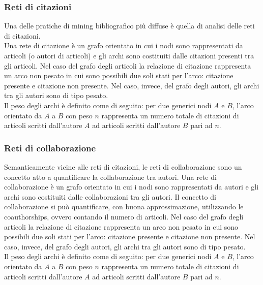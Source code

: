 \documentclass[a4paper, 12pt]{article}
\begin{document}
\subsubsection{Reti di citazioni}
Una delle pratiche di mining bibliografico più diffuse è quella di analisi delle reti di citazioni. \\
Una rete di citazione è un grafo orientato in cui i nodi sono rappresentati da articoli (o autori di articoli) e gli archi sono costituiti dalle citazioni presenti tra gli articoli. Nel caso del grafo degli articoli la relazione di citazione rappresenta un arco non pesato in cui sono possibili due soli stati per l'arco: citazione presente e citazione non presente.
Nel caso, invece, del grafo degli autori, gli archi tra gli autori sono di tipo pesato. \\
Il peso degli archi è definito come di seguito: per due generici nodi $A$ e $B$, l'arco orientato da $A$ a $B$ con peso $n$ rappresenta un numero totale di citazioni di articoli scritti dall'autore $A$ ad articoli scritti dall'autore $B$ pari ad $n$.
\subsubsection{Reti di collaborazione}
Semanticamente vicine alle reti di citazioni, le reti di collaborazione sono un concetto atto a quantificare la collaborazione tra autori.
Una rete di collaborazione è un grafo orientato in cui i nodi sono rappresentati da autori e gli archi sono costituiti dalle collaborazioni tra gli autori. Il concetto di collaborazione si può quantificare, con buona approssimazione, utilizzando le coauthorships, ovvero contando il numero di articoli. Nel caso del grafo degli articoli la relazione di citazione rappresenta un arco non pesato in cui sono possibili due soli stati per l'arco: citazione presente e citazione non presente.
Nel caso, invece, del grafo degli autori, gli archi tra gli autori sono di tipo pesato. \\
Il peso degli archi è definito come di seguito: per due generici nodi $A$ e $B$, l'arco orientato da $A$ a $B$ con peso $n$ rappresenta un numero totale di citazioni di articoli scritti dall'autore $A$ ad articoli scritti dall'autore $B$ pari ad $n$.
\end{document}
